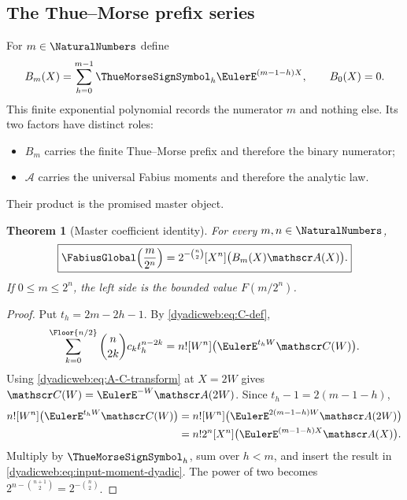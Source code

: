 \documentclass[11pt,oneside]{article}
\newtheorem{theorem}{Theorem}[section]
\theoremstyle{definition}
\theoremstyle{remark}
\begin{document}
\subsection{The Thue--Morse prefix series}

For $m\in\NaturalNumbers$ define
\begin{equation}
 B_m(X)=\sum_{h=0}^{m-1}\ThueMorseSignSymbol_h\EulerE^{(m-1-h)X},
 \qquad B_0(X)=0.                                         \label{dyadicweb:eq:Bm-def}
\end{equation}
This finite exponential polynomial records the numerator $m$ and nothing else.  Its two
factors have distinct roles:
\begin{itemize}
\item $B_m$ carries the finite Thue--Morse prefix and therefore the binary numerator;
\item $\mathscr A$ carries the universal Fabius moments and therefore the analytic law.
\end{itemize}
Their product is the promised master object.

\begin{theorem}[Master coefficient identity]
\label{dyadicweb:thm:master-coefficient}
For every $m,n\in\NaturalNumbers$,
\begin{equation}
 \boxed{
 \FabiusGlobal\!\left(\frac{m}{2^n}\right)
 =2^{-\binom n2}[X^n]\bigl(B_m(X)\mathscr A(X)\bigr).}    \label{dyadicweb:eq:master-coefficient}
\end{equation}
If $0\le m\le2^n$, the left side is the bounded value $F(m/2^n)$.
\end{theorem}

\begin{proof}
Put $t_h=2m-2h-1$.  By \eqref{dyadicweb:eq:C-def},
\[
 \sum_{k=0}^{\Floor{n/2}}\binom n{2k}c_kt_h^{n-2k}
 =n![W^n]\bigl(\EulerE^{t_hW}\mathscr C(W)\bigr).
\]
Using \eqref{dyadicweb:eq:A-C-transform} at $X=2W$ gives
$\mathscr C(W)=\EulerE^{-W}\mathscr A(2W)$.  Since $t_h-1=2(m-1-h)$,
\begin{align*}
 n![W^n]\bigl(\EulerE^{t_hW}\mathscr C(W)\bigr)
 &=n![W^n]\bigl(\EulerE^{2(m-1-h)W}\mathscr A(2W)\bigr)\\
 &=n!2^n[X^n]\bigl(\EulerE^{(m-1-h)X}\mathscr A(X)\bigr).
\end{align*}
Multiply by $\ThueMorseSignSymbol_h$, sum over $h<m$, and insert the result in
\eqref{dyadicweb:eq:input-moment-dyadic}.  The power of two becomes
$2^{n-\binom{n+1}{2}}=2^{-\binom n2}$.
\end{proof}
\end{document}
